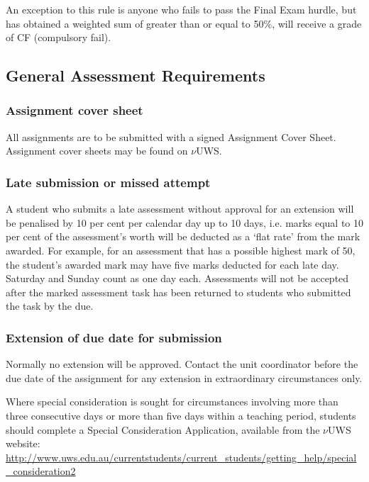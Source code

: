 \documentclass{uws_learning_guide}
\newcommand{\vuws}{$\nu$UWS}
\begin{document}
An exception to this rule is anyone who fails to pass the Final Exam
hurdle, but has obtained a weighted sum of greater than or equal to
50\%, will receive a grade of CF (compulsory fail).

\subsection{General Assessment Requirements}

\subsubsection{\informationlogo{} Assignment cover sheet}

All assignments are to be submitted with a signed Assignment Cover
Sheet. Assignment cover sheets may be found on \vuws{}.

\subsubsection{Late submission or missed attempt}

A student who submits a late assessment without approval for an
extension will be penalised by 10 per cent per calendar day up to 10
days, i.e. marks equal to 10 per cent of the assessment’s worth will
be deducted as a `flat rate' from the mark awarded. For example, for
an assessment that has a possible highest mark of 50, the student’s
awarded mark may have five marks deducted for each late day. Saturday
and Sunday count as one day each. Assessments will not be accepted
after the marked assessment task has been returned to students who
submitted the task by the due.  


\subsubsection{Extension of due date for submission}

Normally no extension will be approved. Contact the unit coordinator
before the due date of the assignment for any extension in
extraordinary circumstances only.

Where special consideration is sought for circumstances involving more
than three consecutive days or more than five days within a teaching
period, students should complete a Special Consideration Application,
available from the \vuws{} website: \href{http://www.uws.edu.au/currentstudents/current_students/getting_help/special_consideration2}{http://www.uws.edu.au/currentstudents/current\_students/getting\_help/special\_consideration2}
\end{document}
